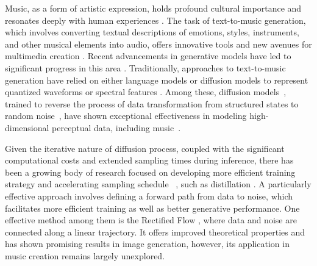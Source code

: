 Music, as a form of artistic expression, holds profound cultural importance and resonates deeply with human experiences \cite{briot2017deep}. The task of text-to-music generation, which involves converting textual descriptions of emotions, styles, instruments, and other musical elements into audio, offers innovative tools and new avenues for multimedia creation \cite{huang2023noise2music}. Recent advancements in generative models have led to significant progress in this area \cite{yang2017midinet,dong2018musegan,mittal2021symbolic}. Traditionally, approaches to text-to-music generation have relied on either language models or diffusion models to represent quantized waveforms or spectral features \cite{agostinelli2023musiclm,lam2024efficient,liu2024audioldm,evans2024stable,schneider2024mousai,fei2024music,fei2023masked,chen2024musicldm}. Among these, diffusion models~\citep{Song2020ScoreBasedGM}, trained to reverse the process of data transformation from structured states to random noise~\citep{SohlDickstein2015DeepUL,song2020generative}, have shown exceptional effectiveness in modeling high-dimensional perceptual data, including music~\citep{ho2020denoising,huang2023make,ho2022video,kong2020diffwave,rombach2022high}.

Given the iterative nature of diffusion process, coupled with the significant computational costs and extended sampling times during inference, there has been a growing body of research focused on developing more efficient training strategy and accelerating sampling schedule ~\citep{karras2023analyzing,liu2022flow,lu2022dpm,fei2019fast,lu2022dpm2,kingma2024understanding}, such as distillation \cite{sauer2024fast,song2023consistency,song2023improved}. A particularly effective approach involves defining a forward path from data to noise, which facilitates more efficient training \cite{ma2024sit} as well as better generative performance. One effective method among them is the Rectified Flow \citep{liu2022flow,albergo2022building,lipman2023flow}, where data and noise are connected along a linear trajectory. It offers improved theoretical properties and has shown promising results in image generation\cite{ma2024sit,esser2024scaling}, however, its application in music creation remains largely unexplored.

